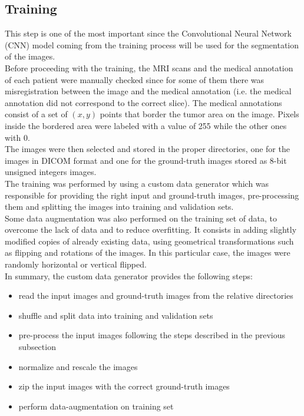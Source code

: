 \documentclass{standalone}
\begin{document}
\subsection{Training}

This step is one of the most important since the Convolutional Neural Network (CNN) model coming from the training process will be used for the segmentation of the images.
\\
Before proceeding with the training, the MRI scans and the medical annotation of each patient were manually checked since for some of them there was misregistration between the image and the medical annotation (i.e. the medical annotation did not correspond to the correct slice).
The medical annotations consist of a set of $(x, y)$ points that border the tumor area on the image.
Pixels inside the bordered area were labeled with a value of 255 while the other ones with 0.
\\
The images were then selected and stored in the proper directories, one for the images in DICOM format and one for the ground-truth images stored as 8-bit unsigned integers images.
\\
The training was performed by using a custom data generator which was responsible for providing the right input and ground-truth images, pre-processing them and splitting the images into training and validation sets.
\\
Some data augmentation was also performed on the training set of data, to overcome the lack of data and to reduce overfitting.
It consists in adding slightly modified copies of already existing data, using geometrical transformations such as flipping and rotations of the images.
In this particular case, the images were randomly horizontal or vertical flipped.
\\
In summary, the custom data generator provides the following steps: 
\begin{itemize}
    \item read the input images and ground-truth images from the relative directories
    \item shuffle and split data into training and validation sets
    \item pre-process the input images following the steps described in the previous subsection
    \item normalize and rescale the images
    \item zip the input images with the correct ground-truth images
    \item perform data-augmentation on training set
\end{itemize} 
\end{document}
